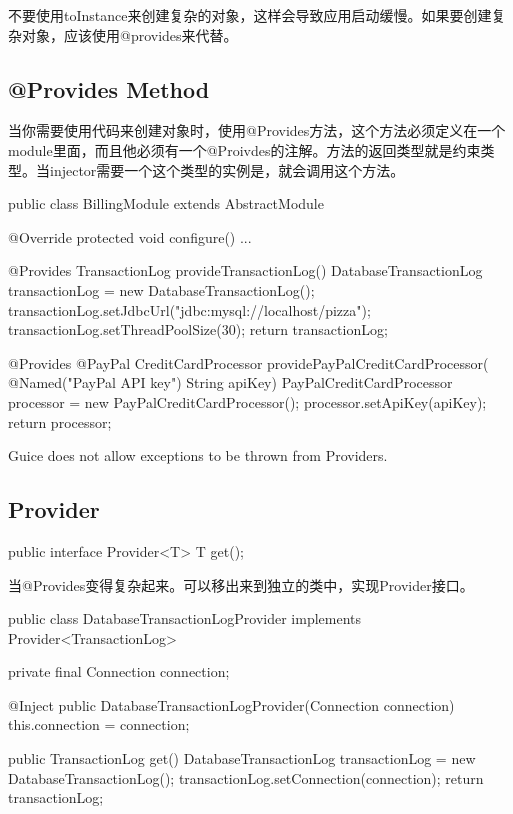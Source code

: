 不要使用toInstance来创建复杂的对象，这样会导致应用启动缓慢。如果要创建复杂对象，应该使用@provides来代替。


\subsection{@Provides Method}

当你需要使用代码来创建对象时，使用@Provides方法，这个方法必须定义在一个module里面，而且他必须有一个@Proivdes的注解。方法的返回类型就是约束类型。当injector需要一个这个类型的实例是，就会调用这个方法。

\begin{Java}
public class BillingModule extends AbstractModule {
  @Override
  protected void configure() {
    ...
  }

  @Provides
  TransactionLog provideTransactionLog() {
    DatabaseTransactionLog transactionLog = new DatabaseTransactionLog();
    transactionLog.setJdbcUrl("jdbc:mysql://localhost/pizza");
    transactionLog.setThreadPoolSize(30);
    return transactionLog;
  }
}
\end{Java}


\begin{Java}
  @Provides @PayPal
  CreditCardProcessor providePayPalCreditCardProcessor(
      @Named("PayPal API key") String apiKey) {
    PayPalCreditCardProcessor processor = new PayPalCreditCardProcessor();
    processor.setApiKey(apiKey);
    return processor;
  }
\end{Java}


Guice does not allow exceptions to be thrown from Providers.

\subsection{Provider}

\begin{Java}[Provider接口]
public interface Provider<T> {
  T get();
}
\end{Java}

当@Provides变得复杂起来。可以移出来到独立的类中，实现Provider接口。


\begin{Java}[Provider可以通过Inject构造函数来注入依赖]
public class DatabaseTransactionLogProvider implements Provider<TransactionLog> {
  private final Connection connection;

  @Inject
  public DatabaseTransactionLogProvider(Connection connection) {
    this.connection = connection;
  }

  public TransactionLog get() {
    DatabaseTransactionLog transactionLog = new DatabaseTransactionLog();
    transactionLog.setConnection(connection);
    return transactionLog;
  }
}
\end{Java}

